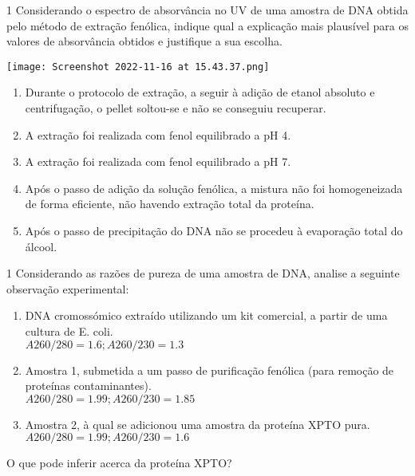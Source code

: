 \documentclass[\mainfilename]{subfiles}
\begin{document}
\begin{questionBox}1{ %
    Considerando o espectro de absorvância no UV de uma amostra de DNA obtida pelo método de extração fenólica, indique qual a explicação mais plausível para os valores de absorvância obtidos e justifique a sua escolha.
} %
    
    \begin{center}
        \texttt{[image: Screenshot 2022-11-16 at 15.43.37.png]}
    \end{center}

    \begin{enumerate}[label=\alph{enumi}.]
        \item Durante o protocolo de extração, a seguir à adição de etanol absoluto e centrifugação, o pellet soltou-se e não se conseguiu recuperar.
        \item A extração foi realizada com fenol equilibrado a pH 4.
        \item A extração foi realizada com fenol equilibrado a pH 7.
        \item Após o passo de adição da solução fenólica, a mistura não foi homogeneizada de forma eficiente, não havendo extração total da proteína.
        \item Após o passo de precipitação do DNA não se procedeu à evaporação total do álcool.
    \end{enumerate}

\end{questionBox}

\begin{questionBox}1{ %
    Considerando as razões de pureza de uma amostra de DNA, analise a seguinte observação experimental:
} %
    
    \begin{enumerate}[
        label={Amostra \arabic{enumi}:},
        left={0em}
    ]
        \item DNA cromossómico extraído utilizando um kit comercial, a partir de uma cultura de E. coli.\\
        \(A260/280= 1.6; A260/230=1.3\)
        \item Amostra 1, submetida a um passo de purificação fenólica (para remoção de proteínas contaminantes).\\
        \(A260/280=1.99; A260/230= 1.85\)
        \item Amostra 2, à qual se adicionou uma amostra da proteína XPTO pura.\\
        \(A260/280=1.99; A260/230=1.6\)
    \end{enumerate}

    O que pode inferir acerca da proteína XPTO?

\end{questionBox}
\end{document}
